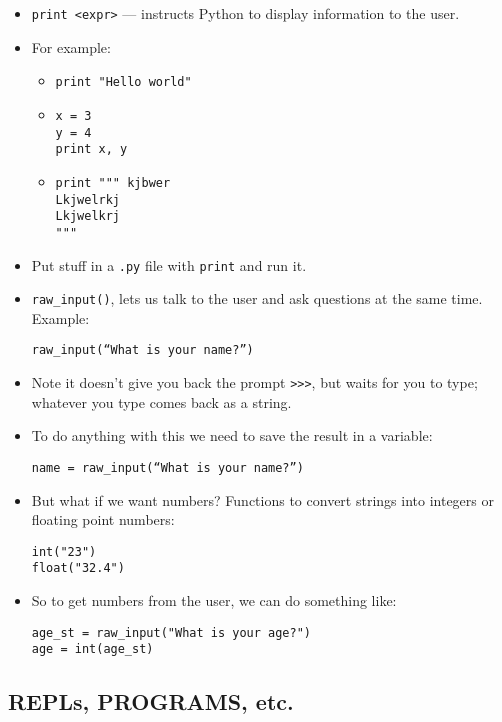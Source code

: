 \documentclass{article}
\begin{document}
\begin{itemize}
\item \verb|print <expr>| --- instructs Python to display information
  to the user.
\item For example:
  \begin{itemize}
  \item \verb|print "Hello world"|
  \item
\begin{verbatim}
x = 3
y = 4
print x, y
\end{verbatim}
  \item
\begin{verbatim}
print """ kjbwer
Lkjwelrkj
Lkjwelkrj
"""
\end{verbatim}
  \end{itemize}

\item Put stuff in a \verb|.py| file with \verb|print| and run it.

\item \verb|raw_input()|, lets us talk to the user and ask questions
  at the same time.  Example:
\begin{verbatim}
raw_input(“What is your name?”)
\end{verbatim}
\item Note it doesn’t give you back the prompt \verb|>>>|, but waits
  for you to type; whatever you type comes back as a string.

\item  To do anything with this we need to save the result in a variable:
\begin{verbatim}
name = raw_input(“What is your name?”)
\end{verbatim}

\item  But what if we want numbers? Functions to convert strings into
  integers or floating point numbers:
\begin{verbatim}
int("23")
float("32.4")
\end{verbatim}

\item So to get numbers from the user, we can do something like:
\begin{verbatim}
age_st = raw_input("What is your age?")
age = int(age_st)
\end{verbatim}
\end{itemize}

\subsection*{REPLs, PROGRAMS, etc.}
\end{document}
